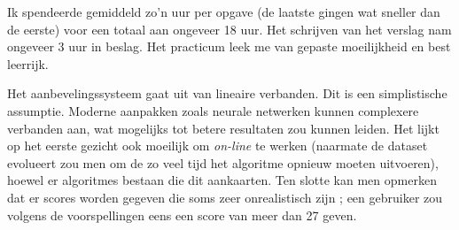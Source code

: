 
Ik spendeerde gemiddeld zo'n uur per opgave (de laatste gingen wat sneller dan de eerste) voor een totaal aan ongeveer 18 uur. Het schrijven van het verslag nam ongeveer 3 uur in beslag. Het practicum leek me van gepaste moeilijkheid en best leerrijk.\\

\par\noindent Het aanbevelingssysteem gaat uit van lineaire verbanden. Dit is een simplistische assumptie. Moderne aanpakken zoals neurale netwerken kunnen complexere verbanden aan, wat mogelijks tot betere resultaten zou kunnen leiden. Het lijkt op het eerste gezicht ook moeilijk om \textit{on-line} te werken (naarmate de dataset evolueert zou men om de zo veel tijd het algoritme opnieuw moeten uitvoeren), hoewel er algoritmes bestaan die dit aankaarten. Ten slotte kan men opmerken dat er scores worden gegeven die soms zeer onrealistisch zijn ; een gebruiker zou volgens de voorspellingen eens een score van meer dan 27 geven.